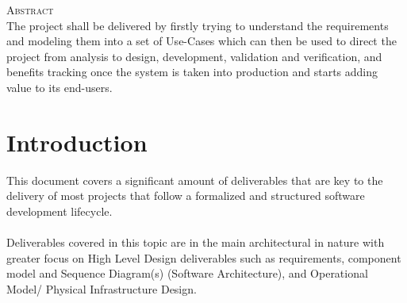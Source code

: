 \documentclass[12pt]{article} %
\begin{document}
		
		\newpage
	
	
	\begin{flushleft}\large
		\textsc{Abstract}\\
		
		The project shall be delivered by firstly trying to understand the requirements and modeling them into a set of Use-Cases which can then be used to direct the project from analysis to design, development, validation and verification, and benefits tracking once the system is taken into production and starts adding value to its end-users.
		
		
	\end{flushleft}
	
	
	\vfill %
	
	\newpage
	
	
	\tableofcontents %
	
	\newpage %
	
	
	\section{Introduction} %
	
This document covers a significant amount of deliverables that are key to the delivery of most projects that follow a formalized and structured software development lifecycle.
\\
\\
Deliverables covered in this topic are in the main architectural in nature with greater focus on High Level Design deliverables such as requirements, component model and Sequence Diagram(s) (Software Architecture), and Operational Model/ Physical Infrastructure Design.
\end{document}
